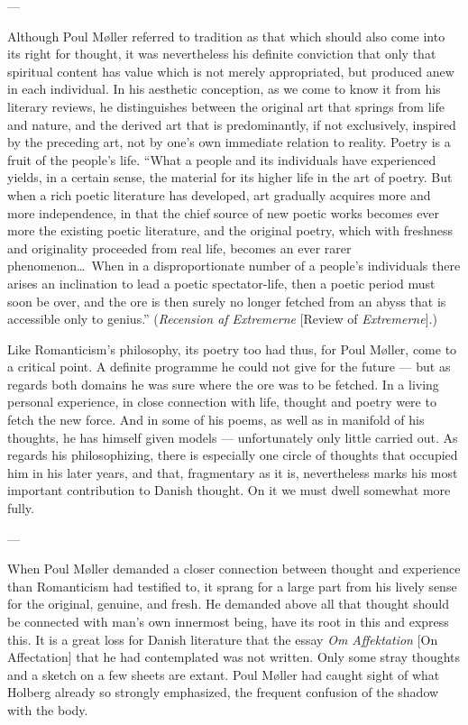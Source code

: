 \documentclass[12pt,a4paper]{book}
\newcommand{\opage}[1]{\marginnote{\footnotesize\textit{[#1]}}}
\begin{document}
\begin{center}---\end{center}

\opage{122}Although Poul Møller referred to tradition as that which should also come into its right for
thought, it was nevertheless his definite conviction that only that spiritual content has
value which is not merely appropriated, but produced anew in each individual. In his
aesthetic conception, as we come to know it from his literary reviews, he distinguishes
between the original art that springs from life and nature, and the derived art that is
predominantly, if not exclusively, inspired by the preceding art, not by one's own immediate
relation to reality. Poetry is a fruit of the people's life. ``What a people and its
individuals have experienced yields, in a certain sense, the material for its higher life in
the art of poetry. But when a rich poetic literature has developed, art gradually acquires
more and more independence, in that the chief source of new poetic works becomes ever more
the existing poetic literature, and the original poetry, which with freshness and originality
proceeded from real life, becomes an ever rarer phenomenon\ldots\ When in a disproportionate
number of a people's individuals there arises an inclination to lead a poetic spectator-life,
then a poetic period must soon be over, and the ore is then surely no longer fetched from an
abyss that is accessible only to genius.'' (\emph{Recension af Extremerne} [Review of
\emph{Extremerne}].)

Like Romanticism's philosophy, its poetry too had thus, for Poul Møller, come to a critical
point. A definite programme he could not give for the future --- but as regards both domains
he was sure where the ore was to be fetched. In a living personal experience, in close
connection with life, thought and poetry were to fetch the new force. And in some of his
poems, as well as in manifold of his thoughts, he has himself given models --- unfortunately
only little carried out. As regards his philosophizing, there is especially one circle of
thoughts that occupied him in his later years, and that, fragmentary as it is, nevertheless
marks his most important contribution to Danish thought. On it we must dwell somewhat more
fully.

\begin{center}---\end{center}

\opage{123}When Poul Møller demanded a closer connection between thought and experience than Romanticism
had testified to, it sprang for a large part from his lively sense for the original, genuine,
and fresh. He demanded above all that thought should be connected with man's own innermost
being, have its root in this and express this. It is a great loss for Danish literature that
the essay \emph{Om Affektation} [On Affectation] that he had contemplated was not written.
Only some stray thoughts and a sketch on a few sheets are extant. Poul Møller had caught
sight of what Holberg already so strongly emphasized, the frequent confusion of the shadow
with the body.
\end{document}
